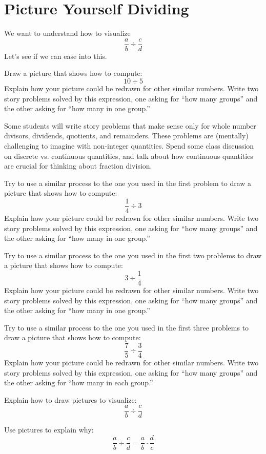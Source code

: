 \newpage
\section{Picture Yourself Dividing}


We want to understand how to visualize 
\[
\frac{a}{b} \div \frac{c}{d}
\]
Let's see if we can ease into this.

\begin{prob}
Draw a picture that shows how to compute:
\[
10\div 5
\]
Explain how your picture could be redrawn for other similar
numbers. Write two story problems solved by this expression, one
asking for ``how many groups'' and the other asking for ``how many in
one group.''
\end{prob}

\begin{teachingnote}
Some students will write story problems that make sense only for whole number divisors, dividends, quotients, and remainders.  These problems are (mentally) challenging to imagine with non-integer quantities.  Spend some class discussion on discrete vs. continuous quantities, and talk about how continuous quantities are crucial for thinking about fraction division.  
\end{teachingnote}

\begin{prob}
Try to use a similar process to the one you used in the first problem
to draw a picture that shows how to compute:
\[
\frac{1}{4} \div 3
\]
Explain how your picture could be redrawn for other similar numbers.
Write two story problems solved by this expression, one asking for
``how many groups'' and the other asking for ``how many in one
group.''
\end{prob}


\begin{prob}
Try to use a similar process to the one you used in the first two problems
to draw a picture that shows how to compute:
\[
3 \div \frac{1}{4}
\]
Explain how your picture could be redrawn for other similar numbers.
Write two story problems solved by this expression, one asking for
``how many groups'' and the other asking for ``how many in one
group.''
\end{prob}


\begin{prob}
Try to use a similar process to the one you used in the first three problems
to draw a picture that shows how to compute:
\[
\frac{7}{5} \div \frac{3}{4}
\]
Explain how your picture could be redrawn for other similar numbers.
Write two story problems solved by this expression, one asking for
``how many groups'' and the other asking for ``how many in each
group.''
\end{prob}

\begin{prob}
Explain how to draw pictures to visualize:
\[
\frac{a}{b} \div \frac{c}{d}
\]
\end{prob}

\begin{prob}
Use pictures to explain why:
\[
\frac{a}{b} \div \frac{c}{d} = \frac{a}{b} \cdot \frac{d}{c}
\]
\end{prob}
